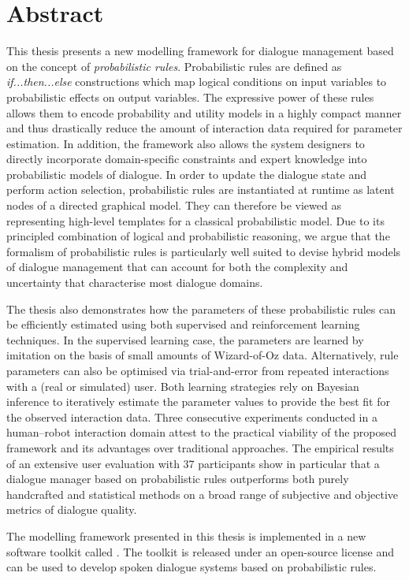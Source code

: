 \chapter*{Abstract}

This thesis presents a new modelling framework for dialogue management based on the concept of \textit{probabilistic rules}.  Probabilistic rules are defined as \textit{if...then...else} constructions which map logical conditions on input variables to probabilistic effects on output variables. The expressive power of these rules allows them to encode probability and utility models in a highly compact manner and thus drastically reduce the amount of interaction data required for parameter estimation. In addition, the framework also allows the system designers to directly incorporate domain-specific constraints and expert knowledge into probabilistic models of dialogue.  In order to update the dialogue state and perform action selection, probabilistic rules are instantiated at runtime as latent nodes of a directed graphical model.  They can therefore be viewed as representing high-level templates for a classical probabilistic model. Due to its principled combination of logical and probabilistic reasoning, we argue that the formalism of probabilistic rules is particularly well suited to devise hybrid models of dialogue management that can account for both the complexity and uncertainty that characterise most dialogue domains.

The thesis also demonstrates how the parameters of these probabilistic rules can be efficiently estimated using both supervised and reinforcement learning techniques. In the supervised learning case, the parameters are learned by imitation on the basis of small amounts of Wizard-of-Oz data.  Alternatively, rule parameters can also be optimised via trial-and-error from repeated interactions with a (real or simulated) user. Both learning strategies rely on Bayesian inference to iteratively estimate the parameter values to provide the best fit for the observed interaction data. Three consecutive experiments conducted in a human--robot interaction domain attest to the practical viability of the proposed framework and its advantages over traditional approaches.  The empirical results of an extensive user evaluation with 37 participants show in particular that a dialogue manager based on probabilistic rules outperforms both purely handcrafted and statistical methods on a broad range of subjective and objective metrics of dialogue quality.

The modelling framework presented in this thesis is implemented in a new software toolkit called \opendial{}.  The toolkit is released under an open-source license and can be used to develop spoken dialogue systems based on probabilistic rules. 
